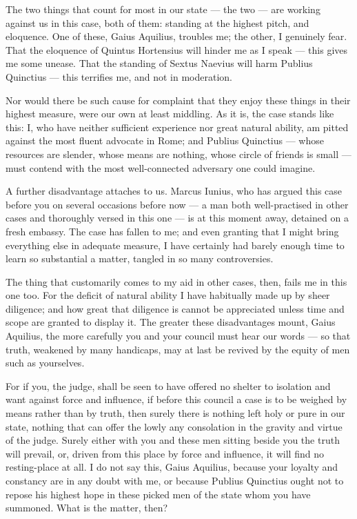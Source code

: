 
 The two things that count for most in our state — the two — are working against us in this case, both of them: standing at the highest pitch, and eloquence. One of these, Gaius Aquilius, troubles me; the other, I genuinely fear. That the eloquence of Quintus Hortensius will hinder me as I speak --- this gives me some unease. That the standing of Sextus Naevius will harm Publius Quinctius --- this terrifies me, and not in moderation.

 Nor would there be such cause for complaint that they enjoy these things in their highest measure, were our own at least middling. As it is, the case stands like this: I, who have neither sufficient experience nor great natural ability, am pitted against the most fluent advocate in Rome; and Publius Quinctius — whose resources are slender, whose means are nothing, whose circle of friends is small — must contend with the most well-connected adversary one could imagine.

 A further disadvantage attaches to us. Marcus Iunius, who has argued this case before you on several occasions before now --- a man both well-practised in other cases and thoroughly versed in this one --- is at this moment away, detained on a fresh embassy. The case has fallen to me; and even granting that I might bring everything else in adequate measure, I have certainly had barely enough time to learn so substantial a matter, tangled in so many controversies.

 The thing that customarily comes to my aid in other cases, then, fails me in this one too. For the deficit of natural ability I have habitually made up by sheer diligence; and how great that diligence is cannot be appreciated unless time and scope are granted to display it. The greater these disadvantages mount, Gaius Aquilius, the more carefully you and your council must hear our words --- so that truth, weakened by many handicaps, may at last be revived by the equity of men such as yourselves.

 For if you, the judge, shall be seen to have offered no shelter to isolation and want against force and influence, if before this council a case is to be weighed by means rather than by truth, then surely there is nothing left holy or pure in our state, nothing that can offer the lowly any consolation in the gravity and virtue of the judge. Surely either with you and these men sitting beside you the truth will prevail, or, driven from this place by force and influence, it will find no resting-place at all. I do not say this, Gaius Aquilius, because your loyalty and constancy are in any doubt with me, or because Publius Quinctius ought not to repose his highest hope in these picked men of the state whom you have summoned. What is the matter, then?

